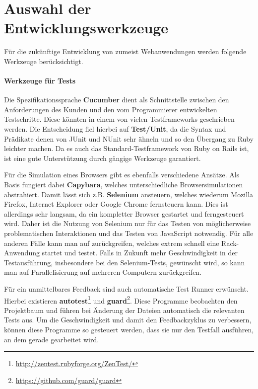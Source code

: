 \section{Auswahl der Entwicklungswerkzeuge}
\label{sec:devtools}

Für die zukünftige Entwicklung von zumeist Webanwendungen werden folgende Werkzeuge berücksichtigt.

\paragraph{Werkzeuge für Tests} Die Spezifikationssprache \textbf{Cucumber} dient als Schnittstelle zwischen den Anforderungen des Kunden und den vom Programmierer entwickelten Testschritte. Diese könnten in einem von vielen Testframeworks geschrieben werden. Die Entscheidung fiel hierbei auf \textbf{Test/Unit}, da die Syntax und Prädikate denen von JUnit und NUnit sehr ähneln und so den Übergang zu Ruby leichter machen. Da es auch das Standard-Testframework von Ruby on Rails ist, ist eine gute Unterstützung durch gängige Werkzeuge garantiert.

Für die Simulation eines Browsers gibt es ebenfalls verschiedene Ansätze. Als Basis fungiert dabei \textbf{Capybara}, welches unterschiedliche Browsersimulationen abstrahiert. Damit lässt sich z.B. \textbf{Selenium} ansteuern, welches wiederum Mozilla Firefox, Internet Explorer oder Google Chrome fernsteuern kann. Dies ist allerdings sehr langsam, da ein kompletter Browser gestartet und ferngesteuert wird. Daher ist die Nutzung von Selenium nur für das Testen von möglicherweise problematischen Interaktionen und das Testen von JavaScript notwendig. Für alle anderen Fälle kann man auf \textbf{} zurückgreifen, welches extrem schnell eine Rack-Anwendung startet und testet.
Falls in Zukunft mehr Geschwindigkeit in der Testausführung, insbesondere bei den Selenium-Tests, gewünscht wird, so kann man auf Parallelisierung auf mehreren Computern zurückgreifen.

Für ein unmittelbares Feedback sind auch automatische Test Runner erwünscht. Hierbei existieren \textbf{autotest}\footnote{\url{http://zentest.rubyforge.org/ZenTest/}} und \textbf{guard}\footnote{\url{https://github.com/guard/guard}}. Diese Programme beobachten den Projektbaum und führen bei Änderung der Dateien automatisch die relevanten Tests aus. Um die Geschwindigkeit und damit den Feedbackzyklus zu verbessern, können diese Programme so gesteuert werden, dass sie nur den Testfall ausführen, an dem gerade gearbeitet wird.


